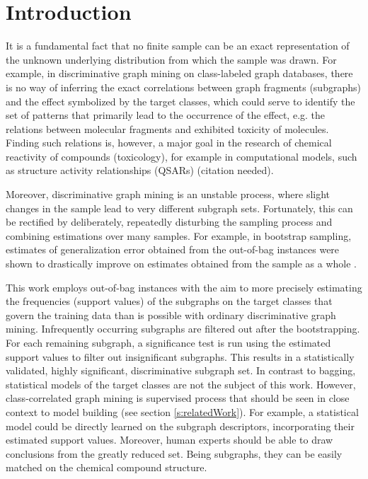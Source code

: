 \documentclass{article}
\begin{document}
\section{Introduction}
It is a fundamental fact that no finite sample can be an exact representation
of the unknown underlying distribution from which the sample was drawn.  For
example, in discriminative graph mining on class-labeled graph databases,
there is no way of inferring the exact correlations between graph fragments
(subgraphs) and the effect symbolized by the target classes, which could serve
to identify the set of patterns that primarily lead to the occurrence of the
effect, e.g. the relations between molecular fragments and exhibited toxicity
of molecules. Finding such relations is, however, a major goal in the research
of chemical reactivity of compounds (toxicology), for example in computational
models, such as structure activity relationships (QSARs) (citation needed).

Moreover, discriminative graph mining is an unstable process, where slight
changes in the sample lead to very different subgraph sets. Fortunately, this
can be rectified by deliberately, repeatedly disturbing the sampling process
and combining estimations over many samples. For example, in bootstrap
sampling, estimates of generalization error obtained from the out-of-bag
instances were shown to drastically improve on estimates obtained from the
sample as a whole \cite{bylander02estimating, breiman96oob}.  

This work employs out-of-bag instances with the aim to more precisely
estimating the frequencies (support values) of the subgraphs on the target
classes that govern the training data than is possible with ordinary
discriminative graph mining. Infrequently occurring subgraphs are filtered
out after the bootstrapping.  For each remaining subgraph, a significance test
is run using the estimated support values to filter out insignificant
subgraphs.  This results in a statistically validated, highly significant,
discriminative subgraph set.  In contrast to bagging, statistical models of the
target classes are not the subject of this work.  However, class-correlated
graph mining is supervised process that should be seen in close context to
model building (see section \ref{s:relatedWork}). For example, a statistical
model could be directly learned on the subgraph descriptors, incorporating
their estimated support values. Moreover, human experts should be able to draw
conclusions from the greatly reduced set. Being subgraphs, they can be easily
matched on the chemical compound structure.
\end{document}
